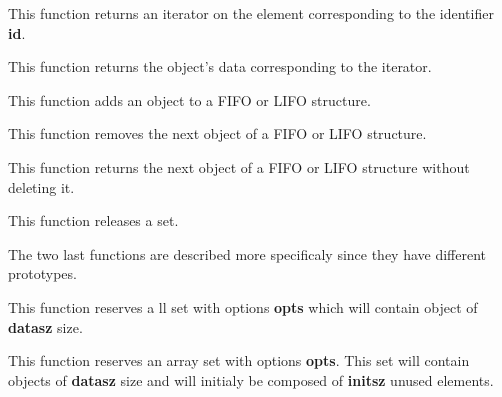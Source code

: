This function returns an iterator on the element corresponding to the
identifier \textbf{id}.


This function returns the object's data corresponding to the iterator.


This function adds an object to a FIFO or LIFO structure.


This function removes the next object of a FIFO or LIFO structure.


This  function returns the  next object  of a  FIFO or  LIFO structure
without deleting it.


This function releases a set.

The two last functions are  described more specificaly since they have
different prototypes.


This function reserves a ll set with options \textbf{opts} which will contain
object of \textbf{datasz} size.


This function reserves an array set with options \textbf{opts}. This
set will contain objects of \textbf{datasz} size and will initialy
be composed of \textbf{initsz} unused elements.

